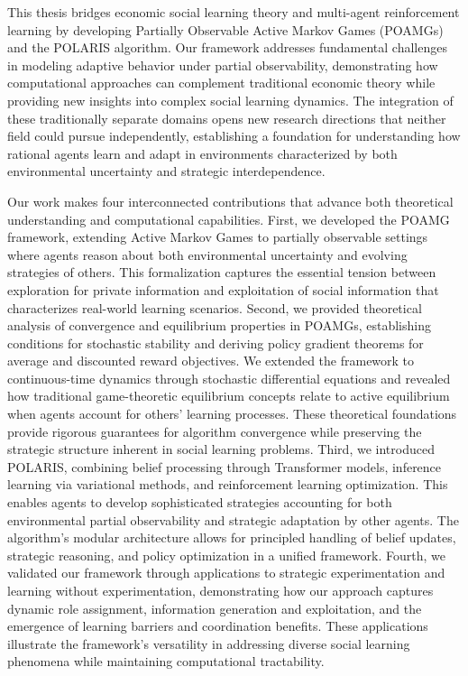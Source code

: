 This thesis bridges economic social learning theory and multi-agent reinforcement learning by developing Partially Observable Active Markov Games (POAMGs) and the POLARIS algorithm. Our framework addresses fundamental challenges in modeling adaptive behavior under partial observability, demonstrating how computational approaches can complement traditional economic theory while providing new insights into complex social learning dynamics. The integration of these traditionally separate domains opens new research directions that neither field could pursue independently, establishing a foundation for understanding how rational agents learn and adapt in environments characterized by both environmental uncertainty and strategic interdependence.


Our work makes four interconnected contributions that advance both theoretical understanding and computational capabilities. First, we developed the POAMG framework, extending Active Markov Games to partially observable settings where agents reason about both environmental uncertainty and evolving strategies of others. This formalization captures the essential tension between exploration for private information and exploitation of social information that characterizes real-world learning scenarios.
Second, we provided theoretical analysis of convergence and equilibrium properties in POAMGs, establishing conditions for stochastic stability and deriving policy gradient theorems for average and discounted reward objectives. We extended the framework to continuous-time dynamics through stochastic differential equations and revealed how traditional game-theoretic equilibrium concepts relate to active equilibrium when agents account for others' learning processes. These theoretical foundations provide rigorous guarantees for algorithm convergence while preserving the strategic structure inherent in social learning problems.
Third, we introduced POLARIS, combining belief processing through Transformer models, inference learning via variational methods, and reinforcement learning optimization. This enables agents to develop sophisticated strategies accounting for both environmental partial observability and strategic adaptation by other agents. The algorithm's modular architecture allows for principled handling of belief updates, strategic reasoning, and policy optimization in a unified framework.
Fourth, we validated our framework through applications to strategic experimentation and learning without experimentation, demonstrating how our approach captures dynamic role assignment, information generation and exploitation, and the emergence of learning barriers and coordination benefits. These applications illustrate the framework's versatility in addressing diverse social learning phenomena while maintaining computational tractability.

